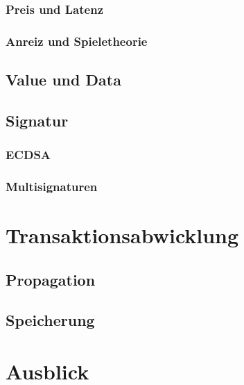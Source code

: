 \documentclass[runningheads]{llncs}
\begin{document}
\subsubsection{Preis und Latenz}

\subsubsection{Anreiz und Spieletheorie}

\subsection{Value und Data}

\subsection{Signatur}

\subsubsection{ECDSA}
\label{ecdsa}

\subsubsection{Multisignaturen}

\section{Transaktionsabwicklung}

\subsection{Propagation}

\subsection{Speicherung}

\section{Ausblick}



\end{document}
